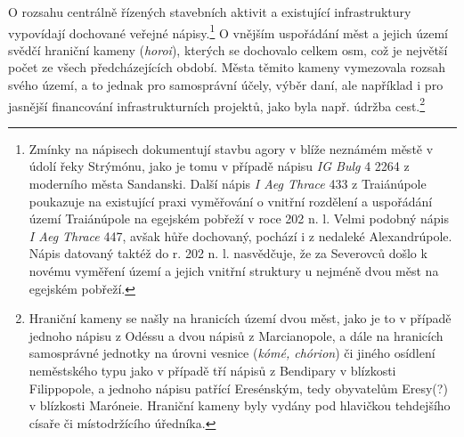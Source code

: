 O rozsahu centrálně řízených stavebních aktivit a existující infrastruktury vypovídají dochované veřejné nápisy.\footnote{Zmínky na nápisech dokumentují stavbu agory v blíže neznámém městě v údolí řeky Strýmónu, jako je tomu v případě nápisu {\em IG Bulg} 4 2264 z moderního města Sandanski. Další nápis {\em I Aeg Thrace} 433 z Traiánúpole poukazuje na existující praxi vyměřování o vnitřní rozdělení a uspořádání území Traiánúpole na egejském pobřeží v roce 202 n. l. Velmi podobný nápis {\em I Aeg Thrace} 447, avšak hůře dochovaný, pochází i z nedaleké Alexandrúpole. Nápis datovaný taktéž do r. 202 n. l. nasvědčuje, že za Severovců došlo k novému vyměření území a jejich vnitřní struktury u nejméně dvou měst na egejském pobřeží.} O vnějším uspořádání měst a jejich území svědčí hraniční kameny ({\em horoi}), kterých se dochovalo celkem osm, což je největší počet ze všech předcházejících období. Města těmito kameny vymezovala rozsah svého území, a to jednak pro samosprávní účely, výběr daní, ale například i pro jasnější financování infrastrukturních projektů, jako byla např. údržba cest.\footnote{Hraniční kameny se našly na hranicích území dvou měst, jako je to v případě jednoho nápisu z Odéssu a dvou nápisů z Marcianopole, a dále na hranicích samosprávné jednotky na úrovni vesnice ({\em kómé, chórion}) či jiného osídlení neměstského typu jako v případě tří nápisů z Bendipary v blízkosti Filippopole, a jednoho nápisu patřící Eresénským, tedy obyvatelům Eresy(?) v blízkosti Maróneie. Hraniční kameny byly vydány pod hlavičkou tehdejšího císaře či místodržícího úředníka.}

